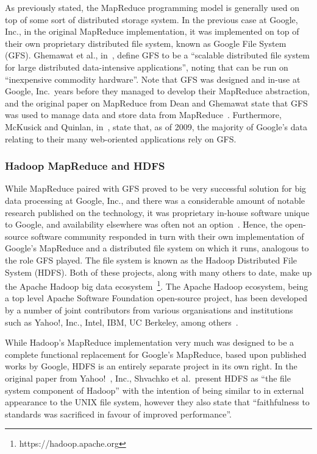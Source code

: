 As previously stated, the MapReduce programming model is generally used on top of some sort of distributed storage
system. In the previous case at Google, Inc., in the original MapReduce implementation, it was implemented on top of
their own proprietary distributed file system, known as Google File System (GFS). Ghemawat et al.,
in~\cite{ghemawat_google_2003}, define GFS to be a ``scalable distributed file system for large distributed data-intensive
applications'', noting that can be run on ``inexpensive commodity hardware''. Note that GFS was designed and in-use
at Google, Inc.\ years before they managed to develop their MapReduce abstraction, and the original paper on MapReduce
from Dean and Ghemawat state that GFS was used to manage data and store data from MapReduce~\cite{dean_mapreduce:_2008}.
Furthermore, McKusick and Quinlan, in~\cite{mckusick2009gfs}, state that, as of 2009, the majority of Google's data
relating to their many web-oriented applications rely on GFS.



\subsubsection{Hadoop MapReduce and HDFS} %
\label{ssub:hadoop_mapreduce_and_hdfs}

While MapReduce paired with GFS proved to be very successful solution for big data processing at Google, Inc., and
there was a considerable amount of notable research published on the technology, it was proprietary in-house software
unique to Google, and availability elsewhere was often not an option~\cite{grossman2009varieties}. Hence, the
open-source software community responded in turn with their own implementation of Google's MapReduce and a
distributed file system on which it runs,
analogous to the role GFS played. The file system is known as the Hadoop Distributed File System (HDFS). Both of these
projects, along with many others to date, make up the Apache Hadoop
big data ecosystem~\footnote{https://hadoop.apache.org}. The Apache Hadoop ecosystem, being a top level Apache Software
Foundation open-source project, has been developed by a number of joint contributors from various organisations and
institutions such as Yahoo!, Inc., Intel, IBM, UC Berkeley, among others~\cite{hadoop_committers}.

While Hadoop's MapReduce implementation very much was designed to be a complete functional replacement for Google's MapReduce, based upon published works by Google,
HDFS is an entirely separate project in its own right. In the original paper from Yahoo!~\cite{shvachko2010hadoop},
Inc., Shvachko et al.\ present HDFS as ``the file system component of Hadoop'' with the intention of being similar to
in external appearance to the UNIX file system, however they also state that ``faithfulness to standards was sacrificed
in favour of improved performance''.

